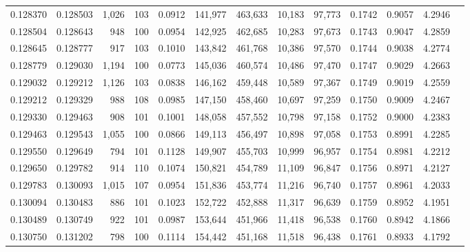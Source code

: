 \begin{tabular}{rrrrrrrrrrrrr}
0.128370 & 0.128503 & 1,026 & 103 &                                     0.0912 & 141,977 & 463,633 &  10,183 &  97,773 & 0.1742 & 0.9057 & 4.2946 \\
0.128504 & 0.128643 &   948 & 100 &                                     0.0954 & 142,925 & 462,685 &  10,283 &  97,673 & 0.1743 & 0.9047 & 4.2859 \\
0.128645 & 0.128777 &   917 & 103 &                                     0.1010 & 143,842 & 461,768 &  10,386 &  97,570 & 0.1744 & 0.9038 & 4.2774 \\
0.128779 & 0.129030 & 1,194 & 100 &                                     0.0773 & 145,036 & 460,574 &  10,486 &  97,470 & 0.1747 & 0.9029 & 4.2663 \\
0.129032 & 0.129212 & 1,126 & 103 &                                     0.0838 & 146,162 & 459,448 &  10,589 &  97,367 & 0.1749 & 0.9019 & 4.2559 \\
0.129212 & 0.129329 &   988 & 108 &                                     0.0985 & 147,150 & 458,460 &  10,697 &  97,259 & 0.1750 & 0.9009 & 4.2467 \\
0.129330 & 0.129463 &   908 & 101 &                                     0.1001 & 148,058 & 457,552 &  10,798 &  97,158 & 0.1752 & 0.9000 & 4.2383 \\
0.129463 & 0.129543 & 1,055 & 100 &                                     0.0866 & 149,113 & 456,497 &  10,898 &  97,058 & 0.1753 & 0.8991 & 4.2285 \\
0.129550 & 0.129649 &   794 & 101 &                                     0.1128 & 149,907 & 455,703 &  10,999 &  96,957 & 0.1754 & 0.8981 & 4.2212 \\
0.129650 & 0.129782 &   914 & 110 &                                     0.1074 & 150,821 & 454,789 &  11,109 &  96,847 & 0.1756 & 0.8971 & 4.2127 \\
0.129783 & 0.130093 & 1,015 & 107 &                                     0.0954 & 151,836 & 453,774 &  11,216 &  96,740 & 0.1757 & 0.8961 & 4.2033 \\
0.130094 & 0.130483 &   886 & 101 &                                     0.1023 & 152,722 & 452,888 &  11,317 &  96,639 & 0.1759 & 0.8952 & 4.1951 \\
0.130489 & 0.130749 &   922 & 101 &                                     0.0987 & 153,644 & 451,966 &  11,418 &  96,538 & 0.1760 & 0.8942 & 4.1866 \\
0.130750 & 0.131202 &   798 & 100 &                                     0.1114 & 154,442 & 451,168 &  11,518 &  96,438 & 0.1761 & 0.8933 & 4.1792 \\

\end{tabular}
